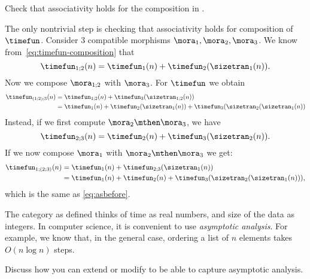 \begin{exercise}
    Check that associativity holds for the composition in \ProcSizeTime.    
\end{exercise}
\begin{solution}
    The only nontrivial step is checking that associativity holds for composition of~$\timefun$. 
    Consider 3 compatible morphisms $\mora_1,\mora_2,\mora_3$.
    We know from~\cref{eq:timefun-composition} that
    \begin{equation}
        \timefun_{1;2} (n) = \timefun_1(n) + \timefun_2(\sizetran_1(n)).
    \end{equation}
    Now we compose $\mora_{1;2}$ with $\mora_3$. For $\timefun$ we obtain
    \begin{align}
        \timefun_{(1;2);3}(n)  &=  \timefun_{1;2}(n) + \timefun_3(\sizetran_{1;2}(n)) \\
        & =  \timefun_1(n)
        + \timefun_2(\sizetran_1(n)) 
        + \timefun_3(\sizetran_2(\sizetran_1(n)) \label{eq:asbefore}
    \end{align}
    Instead, if we first compute $\mora_2\mthen\mora_3$, we have 
    \begin{equation}
        \timefun_{2;3} (n) = \timefun_2(n) + \timefun_3(\sizetran_2(n)).
    \end{equation}
    If we now compose $\mora_1$ with $\mora_2\mthen\mora_3$ we get:
    \begin{align}
        \timefun_{1;(2;3)} (n) &= \timefun_1(n) + \timefun_{2;3}(\sizetran_1(n)) \\
        &= \timefun_1(n) + \timefun_2(n) + \timefun_3(\sizetran_2(\sizetran_1(n))),
    \end{align}
    which is the same as \cref{eq:asbefore}.
\end{solution}

\vfill 
\begin{gradedexercise}
    The category \ProcSizeTime as defined thinks of time as real numbers, and size of the data as integers. 
    In computer science, it is convenient to use \emph{asymptotic analysis}. For example, we know that, in the general case, ordering a list of $n$ elements takes $O(n \log n)$ steps. 

    Discuss how you can extend or modify \ProcSizeTime to be able to capture asymptotic analysis.
\end{gradedexercise}

